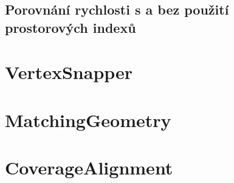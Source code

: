 \subsection{Porovnání rychlosti s a bez použití prostorových indexů}

\section{VertexSnapper}

\section{MatchingGeometry}


\section{CoverageAlignment}
